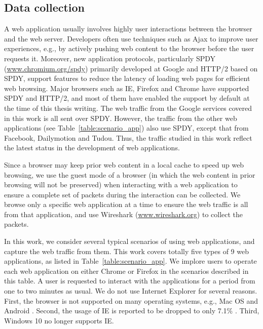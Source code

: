 \documentclass[preprint,12pt]{elsarticle}
\begin{document}
\subsection{Data collection}
\label{sec:collect}

A web application usually involves highly user interactions between the browser and the web server. Developers often use techniques such as Ajax to improve user experiences, e.g., by actively pushing web content to the browser before the user requests it. Moreover, new application protocols, particularly SPDY (\url{www.chromium.org/spdy}) primarily developed at Google and HTTP/2 based on SPDY, support features to reduce the latency of loading web pages for efficient web browsing. Major browsers such as IE, Firefox and Chrome have supported SPDY and HTTP/2, and most of them have enabled the support by default at the time of this thesis writing. The web traffic from the Google services covered in this work is all sent over SPDY. However, the traffic  from the other web applications (see Table~\ref{table:scenario_app}) also use SPDY, except that from Facebook, Dailymotion and Tudou. Thus, the traffic studied in this work reflect the latest status in the development of web applications.  

Since a browser may keep prior web content in a local cache to speed up web browsing, we use the guest mode of a browser (in which the web content in prior browsing will not be preserved) when interacting with a web application to ensure a complete set of packets during the interaction can be collected. We browse only a specific web application at a time to ensure the web traffic is all from that application, and use Wireshark (\url{www.wireshark.org}) to collect the packets. 

In this work, we consider several typical scenarios of using web applications, and capture the web traffic from them. This work covers totally five types of 9 web applications, as listed in Table~\ref{table:scenario_app}. We implore users to operate each web application on either Chrome or Firefox in the scenarios described in this table. A user is requested to interact with the applications for a period from one to two minutes as usual. We do not use Internet Explorer for several reasons. First, the browser is not supported on many operating systems, e.g., Mac OS and Android \cite{IBR}. Second, the usage of IE is reported to be dropped to only 7.1\% \cite{BS}. Third, Windows 10 no longer supports IE. 
\end{document}
